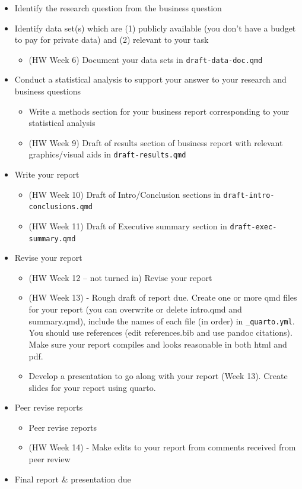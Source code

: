 \documentclass[
  letterpaper,
  DIV=11,
  numbers=noendperiod]{scrreprt}
\providecommand{\tightlist}{%
  \setlength{\itemsep}{0pt}\setlength{\parskip}{0pt}}
\begin{document}
\begin{itemize}
\item
  Identify the research question from the business question
\item
  Identify data set(s) which are (1) publicly available (you don't have
  a budget to pay for private data) and (2) relevant to your task

  \begin{itemize}
  \tightlist
  \item
    (HW Week 6) Document your data sets in \texttt{draft-data-doc.qmd}
  \end{itemize}
\item
  Conduct a statistical analysis to support your answer to your research
  and business questions

  \begin{itemize}
  \item
    Write a methods section for your business report corresponding to
    your statistical analysis
  \item
    (HW Week 9) Draft of results section of business report with
    relevant graphics/visual aids in \texttt{draft-results.qmd}
  \end{itemize}
\item
  Write your report

  \begin{itemize}
  \item
    (HW Week 10) Draft of Intro/Conclusion sections in
    \texttt{draft-intro-conclusions.qmd}
  \item
    (HW Week 11) Draft of Executive summary section in
    \texttt{draft-exec-summary.qmd}
  \end{itemize}
\item
  Revise your report

  \begin{itemize}
  \item
    (HW Week 12 -- not turned in) Revise your report
  \item
    (HW Week 13) - Rough draft of report due. Create one or more qmd
    files for your report (you can overwrite or delete intro.qmd and
    summary.qmd), include the names of each file (in order) in
    \texttt{\_quarto.yml}. You should use references (edit
    references.bib and use pandoc citations). Make sure your report
    compiles and looks reasonable in both html and pdf.
  \item
    Develop a presentation to go along with your report (Week 13).
    Create slides for your report using quarto.
  \end{itemize}
\item
  Peer revise reports

  \begin{itemize}
  \item
    Peer revise reports
  \item
    (HW Week 14) - Make edits to your report from comments received from
    peer review
  \end{itemize}
\item
  Final report \& presentation due
\end{itemize}
\end{document}
